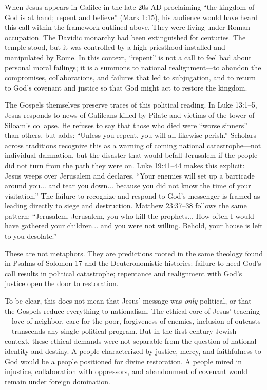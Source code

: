 When Jesus appears in Galilee in the late 20s AD proclaiming ``the kingdom of God is at hand; repent and believe'' (Mark 1:15), his audience would have heard this call within the framework outlined above.
They were living under Roman occupation.
The Davidic monarchy had been extinguished for centuries.
The temple stood, but it was controlled by a high priesthood installed and manipulated by Rome.
In this context, ``repent'' is not a call to feel bad about personal moral failings; it is a summons to national realignment---to abandon the compromises, collaborations, and failures that led to subjugation, and to return to God's covenant and justice so that God might act to restore the kingdom.

The Gospels themselves preserve traces of this political reading.
In Luke 13:1--5, Jesus responds to news of Galileans killed by Pilate and victims of the tower of Siloam's collapse.
He refuses to say that those who died were ``worse sinners'' than others, but adds: ``Unless you repent, you will all likewise perish.''
Scholars across traditions recognize this as a warning of coming national catastrophe---not individual damnation, but the disaster that would befall Jerusalem if the people did not turn from the path they were on.
Luke 19:41--44 makes this explicit: Jesus weeps over Jerusalem and declares, ``Your enemies will set up a barricade around you... and tear you down... because you did not know the time of your visitation.''
The failure to recognize and respond to God's messenger is framed as leading directly to siege and destruction.
Matthew 23:37--38 follows the same pattern: ``Jerusalem, Jerusalem, you who kill the prophets... How often I would have gathered your children... and you were not willing. Behold, your house is left to you desolate.''

These are not metaphors.
They are predictions rooted in the same theology found in Psalms of Solomon 17 and the Deuteronomistic histories: failure to heed God's call results in political catastrophe; repentance and realignment with God's justice open the door to restoration.

To be clear, this does not mean that Jesus' message was \textit{only} political, or that the Gospels reduce everything to nationalism.
The ethical core of Jesus' teaching---love of neighbor, care for the poor, forgiveness of enemies, inclusion of outcasts---transcends any single political program.
But in the first-century Jewish context, these ethical demands were not separable from the question of national identity and destiny.
A people characterized by justice, mercy, and faithfulness to God would be a people positioned for divine restoration.
A people mired in injustice, collaboration with oppressors, and abandonment of covenant would remain under foreign domination.

